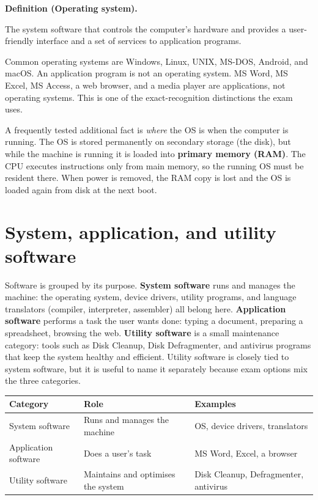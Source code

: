 \documentclass[11pt]{article}
\newenvironment{definitionbox}[1]{%
  \par\noindent\textbf{Definition (#1).}\ \itshape
}{\par\vspace{0.3em}}
\begin{document}
\begin{definitionbox}{Operating system}
The system software that controls the computer's hardware and provides a
user-friendly interface and a set of services to application programs.
\end{definitionbox}

Common operating systems are Windows, Linux, UNIX, MS-DOS, Android, and
macOS. An application program is not an operating system. MS Word, MS Excel,
MS Access, a web browser, and a media player are applications, not operating
systems. This is one of the exact-recognition distinctions the exam uses.

A frequently tested additional fact is \emph{where} the OS is when the
computer is running. The OS is stored permanently on secondary storage (the
disk), but while the machine is running it is loaded into \textbf{primary
memory (RAM)}. The CPU executes instructions only from main memory, so the
running OS must be resident there. When power is removed, the RAM copy is
lost and the OS is loaded again from disk at the next boot.

\section{System, application, and utility software}
Software is grouped by its purpose. \textbf{System software} runs and manages
the machine: the operating system, device drivers, utility programs, and
language translators (compiler, interpreter, assembler) all belong here.
\textbf{Application software} performs a task the user wants done: typing a
document, preparing a spreadsheet, browsing the web. \textbf{Utility
software} is a small maintenance category: tools such as Disk Cleanup, Disk
Defragmenter, and antivirus programs that keep the system healthy and
efficient. Utility software is closely tied to system software, but it is
useful to name it separately because exam options mix the three categories.

\begin{center}
\begin{tabular}{p{}p{}p{}}
\toprule
\textbf{Category} & \textbf{Role} & \textbf{Examples} \\
\midrule
System software & Runs and manages the machine & OS, device drivers, translators \\
Application software & Does a user's task & MS Word, Excel, a browser \\
Utility software & Maintains and optimises the system & Disk Cleanup, Defragmenter, antivirus \\
\bottomrule
\end{tabular}
\end{center}
\end{document}
